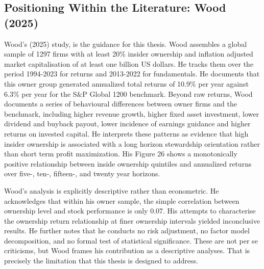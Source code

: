 \subsection{Positioning Within the Literature: Wood (2025)}

Wood's (2025) study, is the guidance for this thesis. Wood assembles a global sample of 1297 firms with at least 20\% insider ownership and inflation adjusted market capitalisation of at least one billion US dollars. He tracks them over the period 1994-2023 for returns and 2013-2022 for fundamentals. He documents that this owner group generated annualized total returns of 10.9\% per year against 6.3\% per year for the S\&P Global 1200 benchmark. Beyond raw returns, Wood documents a series of behavioural differences between owner firms and the benchmark, including higher revenue growth, higher fixed asset investment, lower dividend and buyback payout, lower incidence of earnings guidance and higher returns on invested capital. He interprets these patterns as evidence that high insider ownership is associated with a long horizon stewardship orientation rather than short term profit maximization. His Figure 26 shows a monotonically positive relationship between inside ownership quintiles and annualized returns over five-, ten-, fifteen-, and twenty year horizons.

Wood's analysis is explicitly descriptive rather than econometric. He acknowledges that within his owner sample, the simple correlation between ownership level and stock performance is only 0.07. His attempts to characterise the ownership return relationship at finer ownership intervals yielded inconclusive results. He further notes that he conducts no risk adjustment, no factor model decomposition, and no formal test of statistical significance. These are not per se criticisms, but Wood frames his contribution as a descriptive analyses. That is precisely the limitation that this thesis is designed to address.

